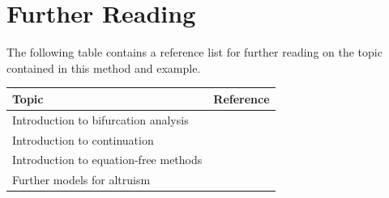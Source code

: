 \documentclass[11pt]{article}
\begin{document}

 
 
 
\section{Further Reading}

The following table contains a reference list for further reading on the topic contained in this method and example. 
\begin{center}
\begin{tabular}{|l|c|}
\hline
Topic									&	Reference \\ \hline
Introduction to bifurcation analysis		&	\cite{Meunier1988}	\\
Introduction to continuation 			&	\cite{Doedel1991,Allgower1990,Rheinboldt2000,Krauskopf2007} \\ 
Introduction to equation-free methods	&	\cite{Theodoropoulos2000,Kevrekidis2003,Kevrekidis2009}	\\
Further models for altruism				&	\cite{Boyd2003, Camerer2003, Mohtashemi2003, Shultz2009, Nowak1998, Janssen2014, Janssen2014b, Janssen2008b, Pepper2007} \\
\hline
\end{tabular}
\end{center}
\end{document}
